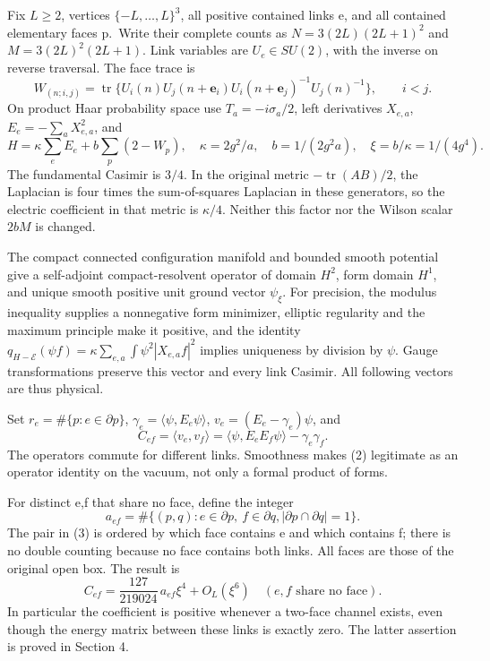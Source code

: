 \documentclass[
  11pt,
]{article}
\begin{document}
Fix \(L\geq2\), vertices \(\{-L,\ldots,L\}^3\), all positive contained
links e, and all contained elementary faces p.~Write their complete
counts as \(N=3(2L)(2L+1)^2\) and \(M=3(2L)^2(2L+1)\). Link variables
are \(U_e\in SU(2)\), with the inverse on reverse traversal. The face
trace is \[
 W_{(n;i,j)}=\operatorname{tr}\{U_i(n)U_j(n+\mathbf e_i)
           U_i(n+\mathbf e_j)^{-1}U_j(n)^{-1}\},\qquad i<j.
\] On product Haar probability space use \(T_a=-i\sigma_a/2\), left
derivatives \(X_{e,a}\), \(E_e=-\sum_aX_{e,a}^2\), and \[
 H=\kappa\sum_eE_e+b\sum_p(2-W_p),\quad
 \kappa=2g^2/a,\quad b=1/(2g^2a),\quad\xi=b/\kappa=1/(4g^4).
\tag{1}
\] The fundamental Casimir is \(3/4\). In the original metric
\(-\operatorname{tr}(AB)/2\), the Laplacian is four times the
sum-of-squares Laplacian in these generators, so the electric
coefficient in that metric is \(\kappa/4\). Neither this factor nor the
Wilson scalar \(2bM\) is changed.

The compact connected configuration manifold and bounded smooth
potential give a self-adjoint compact-resolvent operator of domain
\(H^2\), form domain \(H^1\), and unique smooth positive unit ground
vector \(\psi_\xi\). For precision, the modulus inequality supplies a
nonnegative form minimizer, elliptic regularity and the maximum
principle make it positive, and the identity
\(q_{H-\mathcal E}(\psi f)=\kappa\sum_{e,a}\int\psi^2|X_{e,a}f|^2\)
implies uniqueness by division by \(\psi\). Gauge transformations
preserve this vector and every link Casimir. All following vectors are
thus physical.

Set \(r_e=\#\{p:e\in\partial p\}\),
\(\gamma_e=\langle\psi,E_e\psi\rangle\), \(v_e=(E_e-\gamma_e)\psi\), and
\[
 C_{ef}=\langle v_e,v_f\rangle
   =\langle\psi,E_eE_f\psi\rangle-\gamma_e\gamma_f.
\tag{2}
\] The operators commute for different links. Smoothness makes (2)
legitimate as an operator identity on the vacuum, not only a formal
product of forms.

For distinct e,f that share no face, define the integer \[
 a_{ef}=\#\{(p,q): e\in\partial p,\ f\in\partial q,
                     |\partial p\cap\partial q|=1\}.
\tag{3}
\] The pair in (3) is ordered by which face contains e and which
contains f; there is no double counting because no face contains both
links. All faces are those of the original open box. The result is \[
 \boxed{C_{ef}=\frac{127}{219024}\,a_{ef}\xi^4+O_L(\xi^6)
        \quad(e,f\text{ share no face}).}
\tag{4}
\] In particular the coefficient is positive whenever a two-face channel
exists, even though the energy matrix between these links is exactly
zero. The latter assertion is proved in Section 4.
\end{document}
